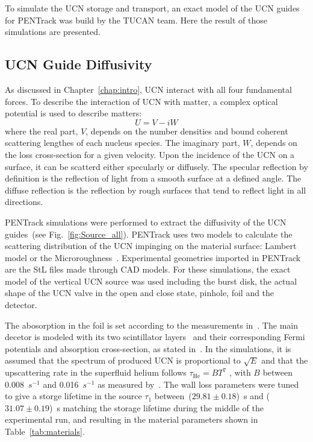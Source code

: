 To simulate the UCN storage and transport, an exact model of the UCN
guides for PENTrack was build by the TUCAN team. Here the result of
those simulations are presented.
\subsection{UCN Guide Diffusivity\label{sec:diffusivity}}
As discussed in Chapter~\ref{chap:intro}, UCN interact with all four
fundamental forces. To describe the interaction of UCN with matter, a
complex optical potential is used to describe matters:
\begin{equation}
  \label{eqn:fermipotential}
  U = V - iW
\end{equation}
where the real part, $V$, depends on the number densities and bound
coherent scattering lengthes of each nucleus species. The imaginary
part, $W$, depends on the loss cross-section for a given velocity.
Upon the incidence of the UCN on a surface, it can be scatterd either
specularly or diffusely. The specular reflection by definition is the
reflection of light from a smooth surface at a defined angle. The
diffuse reflection is the reflection by rough surfaces that tend to
reflect light in all directions.

PENTrack simulations were performed to extract the diffusivity of the
UCN guides~(see Fig.~\ref{fig:Source_all}). PENTrack uses two models
to calculate the scattering distribution of the UCN impinging on the
material surface: Lambert model or the
Microroughness~\cite{Steyerl1972}. Experimental geometries imported in
PENTrack are the StL files made through CAD models. For these
simulations, the exact model of the vertical UCN source was used
including the burst disk, the actual shape of the UCN valve in the
open and close state, pinhole, foil and the detector.

The abosorption in the foil is set according to the measurements
in~\cite{atchison2009transmission}. The main decetor is modeled with
its two scintillator layers~\cite{jamieson2017characterization} and
their corresponding Fermi potentials and absorption cross-section, as
stated in~\cite{Ban2016}. In the simulations, it is assumed that the
spectrum of produced UCN is proportional to $\sqrt{E}$ and that the
upscattering rate in the superfluid helium follows
$\tau_\mathrm{He} = B T^7$ , with $B$ between 0.008~$s^{-1}$ and
0.016~$s^{-1}$ as measured by~\cite{Leung2016}. The wall loss
parameters were tuned to give a storge lifetime in the source $\tau_1$
between~($29.81 \pm 0.18$)~s and ($31.07 \pm 0.19$)~s matching the
storage lifetime during the middle of the experimental run, and
resulting in the material parameters shown in
Table~\ref{tab:materials}.



